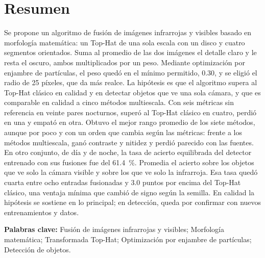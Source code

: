 \chapter*{Resumen}
{}

Se propone un algoritmo de fusión de imágenes infrarrojas y visibles basado en morfología matemática: un
Top-Hat de una sola escala con un disco y cuatro segmentos orientados. Suma al promedio de las dos imágenes
el detalle claro y le resta el oscuro, ambos multiplicados por un peso. Mediante optimización por enjambre
de partículas, el peso quedó en el mínimo permitido, 0.30, y se eligió el radio de 25 píxeles, que da más
realce. La hipótesis es que el algoritmo supera al Top-Hat clásico en calidad y en detectar objetos que ve
una sola cámara, y que es comparable en calidad a cinco métodos multiescala. Con seis métricas sin
referencia en veinte pares nocturnos, superó al Top-Hat clásico en cuatro, perdió en una y empató en otra.
Obtuvo el mejor rango promedio de los siete métodos, aunque por poco y con un orden que cambia según las
métricas: frente a los métodos multiescala, ganó contraste y nitidez y perdió parecido con las fuentes. En
otro conjunto, de día y de noche, la tasa de acierto equilibrada del detector entrenado con sus fusiones
fue del 61.4~\%. Promedia el acierto sobre los objetos que ve solo la cámara visible y sobre los que ve
solo la infrarroja. Esa tasa quedó cuarta entre ocho entradas fusionadas y 3.0 puntos por encima del Top-Hat
clásico, una ventaja mínima que cambió de signo según la semilla. En calidad la hipótesis se sostiene en lo
principal; en detección, queda por confirmar con nuevos entrenamientos y datos.

\textbf{Palabras clave:} Fusión de imágenes infrarrojas y visibles; Morfología matemática; Transformada
Top-Hat; Optimización por enjambre de partículas; Detección de objetos.
